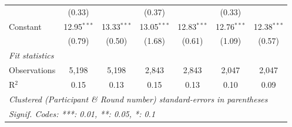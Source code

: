 \begin{tabular}{lcccccc}
                                     & (0.33)        &               & (0.37)        &               & (0.33)        &   \\   
   Constant                          & 12.95$^{***}$ & 13.33$^{***}$ & 13.05$^{***}$ & 12.83$^{***}$ & 12.76$^{***}$ & 12.38$^{***}$\\   
                                     & (0.79)        & (0.50)        & (1.68)        & (0.61)        & (1.09)        & (0.57)\\   
   \midrule
   \emph{Fit statistics}\\
   Observations                      & 5,198         & 5,198         & 2,843         & 2,843         & 2,047         & 2,047\\  
   R$^2$                             & 0.15          & 0.13          & 0.15          & 0.13          & 0.10          & 0.09\\  
   \midrule \midrule
   \multicolumn{7}{l}{\emph{Clustered (Participant \& Round number) standard-errors in parentheses}}\\
   \multicolumn{7}{l}{\emph{Signif. Codes: ***: 0.01, **: 0.05, *: 0.1}}\\
\end{tabular}
\par\endgroup
